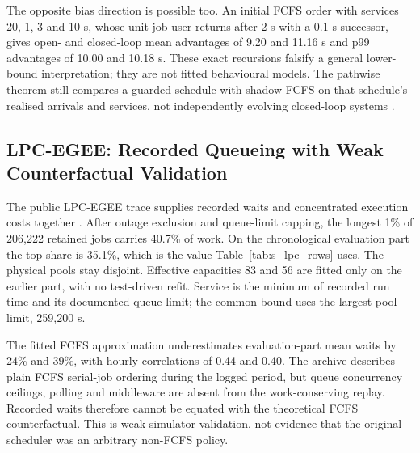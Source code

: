 \documentclass[mathematics,supfile,submit,moreauthors]{Definitions/mdpi}
\newcommand{\devnum}[1]{#1}
\begin{document}
The opposite bias direction is possible too. An initial FCFS order with services
\devnum{20}, \devnum{1}, \devnum{3} and \devnum{10} s, whose unit-job user returns
after \devnum{2} s with a \devnum{0.1} s successor, gives open- and closed-loop
mean advantages of \devnum{9.20} and \devnum{11.16} s and p99 advantages of
\devnum{10.00} and \devnum{10.18} s. These exact recursions falsify a general
lower-bound interpretation; they are not fitted behavioural models. The pathwise
theorem still compares a guarded schedule with shadow FCFS on that schedule's
realised arrivals and services, not independently evolving closed-loop systems
\cite{shmueli2009simulation}.

\subsection{LPC-EGEE: Recorded Queueing with Weak Counterfactual Validation}
\label{sec:supp_lpc}

The public LPC-EGEE trace supplies recorded waits and concentrated execution costs
together \cite{lpc_egee_trace}. After outage exclusion and queue-limit capping,
the longest \devnum{1\%} of \devnum{206{,}222} retained jobs carries
\devnum{40.7\%} of work. On the chronological evaluation part the top share is
\devnum{35.1\%}, which is the value Table~\ref{tab:s_lpc_rows} uses.
The physical pools stay disjoint. Effective capacities \devnum{83} and
\devnum{56} are fitted only on the earlier part, with no test-driven refit.
Service is the minimum of recorded run time and its documented queue limit;
the common bound uses the largest pool limit, \devnum{259{,}200} s.

The fitted FCFS approximation underestimates evaluation-part mean waits by
\devnum{24\%} and \devnum{39\%}, with hourly correlations of \devnum{0.44} and
\devnum{0.40}. The archive describes plain FCFS serial-job ordering during the
logged period, but queue concurrency ceilings, polling and middleware are absent
from the work-conserving replay. Recorded waits therefore cannot be equated with
the theoretical FCFS counterfactual. This is weak simulator validation, not
evidence that the original scheduler was an arbitrary non-FCFS policy.
\end{document}
